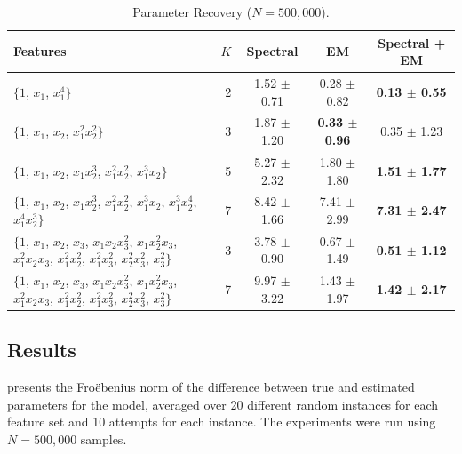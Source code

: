 \begin{table}[t]
\caption{Parameter Recovery ($N = 500,000$).}
\label{tbl:parameter-recovery}
\vskip 0.15in
\begin{center}
\begin{small}
\begin{sc}

  \begin{tabular}{ >{\centering}p{5cm}<{\centering} r c c c }
\hline
\abovespace\belowspace
Features  & $K$ & Spectral & EM & Spectral + EM \\
\hline
\abovespace
$\{1$, $ x_1$, $ x_1^4\}$ 
  & 2 & 1.52 $\pm$ 0.71 & 0.28 $\pm$ 0.82 & {\bf 0.13 $\pm$ 0.55} \\
$\{1$, $ x_1$, $ x_2$, $ x_1^2 x_2^2\}$ 
  & 3 & 1.87 $\pm$ 1.20 & {\bf 0.33 $\pm$ 0.96} & 0.35 $\pm$ 1.23 \\
$\{1$, $ x_1$, $ x_2$, $ x_1 x_2^3$, $ x_1^2 x_2^2$, $ x_1^3 x_2 \}$ 
& 5 & 5.27 $\pm$ 2.32 & 1.80 $\pm$ 1.80 & {\bf 1.51 $\pm$ 1.77} \\
$\{1$, $ x_1$, $ x_2$, $ x_1 x_2^3$, $ x_1^2 x_2^2$, $ x_1^3 x_2$, $ x_1^3 x_2^4$, $ x_1^4 x_2^3 \}$ 
& 7 & 8.42 $\pm$ 1.66 & 7.41 $\pm$ 2.99 & {\bf 7.31 $\pm$ 2.47} \\
$\{1$, $ x_1$, $ x_2$, $ x_3$, $ x_1 x_2 x_3^2$, $ x_1 x_2^2 x_3$, $ x_1^2 x_2 x_3$, $ x_1^2 x_2^2$, $ x_1^2 x_3^2$, $ x_2^2 x_3^2$, $ x_3^2\}$
& 3 & 3.78 $\pm$ 0.90 & 0.67 $\pm$ 1.49 & {\bf 0.51 $\pm$ 1.12} \\
$\{1$, $ x_1$, $ x_2$, $ x_3$, $ x_1 x_2 x_3^2$, $ x_1 x_2^2 x_3$, $ x_1^2 x_2 x_3$, $ x_1^2 x_2^2$, $ x_1^2 x_3^2$, $ x_2^2 x_3^2$, $ x_3^2\}$
  & 7 & 9.97 $\pm$ 3.22 & 1.43 $\pm$ 1.97 & {\bf 1.42 $\pm$ 2.17} \\
\hline
\end{tabular}
\end{sc}
\end{small}
\end{center}
\vskip -0.1in
\end{table}


\subsection{Results}

 presents the Fro\"ebenius norm of the
difference between true and estimated parameters for the model, averaged
over 20 different random instances for each feature set and 10 attempts
for each instance. The experiments were run using $N = 500,000$ samples.

